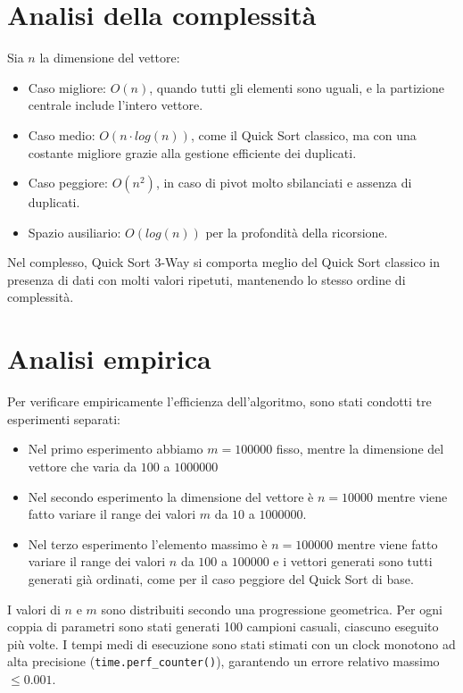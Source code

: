 \documentclass[a4paper, 12pt, oneside]{book}
\begin{document}
\section{Analisi della complessità}

Sia \(n\) la dimensione del vettore:

\begin{itemize}
    \item Caso migliore: \(O(n)\), quando tutti gli elementi sono uguali, e la partizione centrale include l'intero vettore.
    \item Caso medio: \(O(n \cdot log(n))\), come il Quick Sort classico, ma con una costante migliore grazie alla gestione efficiente dei duplicati.
    \item Caso peggiore: \(O(n^2)\), in caso di pivot molto sbilanciati e assenza di duplicati.
    \item Spazio ausiliario: \(O(log(n))\) per la profondità della ricorsione.
\end{itemize}

\noindent Nel complesso, Quick Sort 3-Way si comporta meglio del Quick Sort classico in presenza di dati con molti valori ripetuti, mantenendo lo stesso ordine di complessità.

\section{Analisi empirica}

Per verificare empiricamente l'efficienza dell'algoritmo, sono stati condotti tre esperimenti separati:

\begin{itemize}
    \item Nel primo esperimento abbiamo \(m = 100000\) fisso, mentre la dimensione del vettore che varia da \(100\) a $1000000$
    \item Nel secondo esperimento la dimensione del vettore è \(n = 10000\) mentre viene fatto variare il range dei valori \(m\) da $10$ a $1000000$.
    \item Nel terzo esperimento l'elemento massimo è \(n = 100000\) mentre viene fatto variare il range dei valori \(n\) da $100$ a $100000$ e i vettori generati sono tutti generati già ordinati, come per il caso peggiore del Quick Sort di base.
\end{itemize}

\noindent
I valori di \(n\) e \(m\) sono distribuiti secondo una progressione geometrica. Per ogni coppia di parametri sono stati generati 100 campioni casuali, ciascuno eseguito più volte. I tempi medi di esecuzione sono stati stimati con un clock monotono ad alta precisione (\texttt{time.perf\_counter()}), garantendo un errore relativo massimo \(\leq 0.001\). \\
\end{document}
